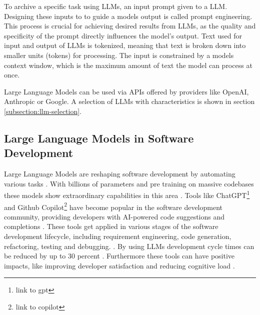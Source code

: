 To archive a specific task using LLMs, an input prompt given to a LLM. Designing these inputs to to guide a models output is called prompt engineering. This process is crucial for achieving desired results from LLMs, as the quality and specificity of the prompt directly influences the model's output. Text used for input and output of LLMs is tokenized, meaning that text is broken down into smaller units (tokens) for processing. The input is constrained by a models context window, which is the maximum amount of text the model can process at once. \cite{naveedComprehensiveOverviewLarge2024}

Large Language Models can be used via APIs offered by providers like OpenAI, Anthropic or Google. A selection of LLMs with characteristics is shown in section \ref{subsection:llm-selection}.

\subsection{Large Language Models in Software Development}

Large Language Models are reshaping software development by automating various tasks \cite{houLargeLanguageModels2024}. With billions of parameters and pre training on massive codebases these models show extraordinary capabilities in this area \cite{chenUnveilingPitfallsUnderstanding2025}. Tools like ChatGPT\footnote{link to gpt} and Github Copilot\footnote{link to copilot} have become popular in the software development community, providing developers with AI-powered code suggestions and completions \cite{bhargavmallampatiRoleGenerativeAI2025}. These tools get applied in various stages of the software development lifecycle, including requirement engineering, code generation, refactoring, testing and debugging. \cite{houLargeLanguageModels2024, puvvadiCodingAgentsComprehensive2025,bhargavmallampatiRoleGenerativeAI2025}. By using LLMs development cycle times can be reduced by up to 30 percent \cite{bhargavmallampatiRoleGenerativeAI2025,kalliamvakouResearchQuantifyingGitHub2022}. Furthermore these tools can have positive impacts, like improving developer satisfaction and reducing cognitive load \cite{kalliamvakouResearchQuantifyingGitHub2022}.

